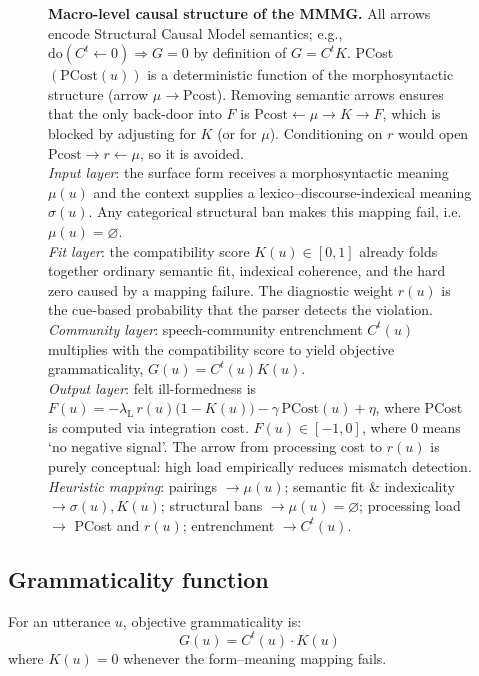 \documentclass[12pt]{article}
\begin{document}
\begin{figure}[htbp]
\begin{tikzpicture}[
  node distance = 1cm and 2.0cm,
  > = latex,
  var/.style = {rectangle, draw, rounded corners, align=center,
                inner sep=4pt, font=\small}
]
\end{tikzpicture}
\caption[Macro-level causal structure]%
{\textbf{Macro-level causal structure of the MMMG.} All arrows encode Structural Causal Model semantics; e.g., $\text{do}(C^{t} \leftarrow 0) \Rightarrow G = 0$ by definition of $G = C^{t}K$. 
PCost $(\text{PCost}(u))$ is a deterministic function of the morphosyntactic structure (arrow $\mu\!\to\!\text{Pcost}$). Removing semantic arrows ensures that the only back-door into $F$ is $\text{Pcost}\!\leftarrow\!\mu\!\to\!K\!\to\!F$, which is blocked by adjusting for $K$ (or for $\mu$). Conditioning on $r$ would open $\text{Pcost}\!\to\!r\!\leftarrow\!\mu$, so it is avoided.
\\\emph{Input layer}: the surface form receives a morphosyntactic meaning $\mu(u)$
and the context supplies a lexico–discourse-indexical meaning $\sigma(u)$.
Any categorical structural ban makes this mapping fail, i.e.\ $\mu(u)=\varnothing$.
\\\emph{Fit layer}: the compatibility score $K(u)\!\in[0,1]$ already folds together ordinary
semantic fit, indexical coherence, and the hard zero caused by a mapping failure.
The diagnostic weight $r(u)$ is the cue-based probability that the parser detects the
violation. 
\\\emph{Community layer}: speech-community entrenchment $C^{t}(u)$ multiplies with the
compatibility score to yield objective grammaticality,
$G(u)=C^{t}(u)K(u)$.
\\\emph{Output layer}: felt ill-formedness is
$F(u)= -\lambda_{\mathrm L}\,r(u)\!\bigl(1-K(u)\bigr)
       -\gamma\,\text{PCost}(u)+\eta$,
where PCost is computed via integration cost. $F(u)\!\in[-1,0]$, where 0 means `no negative signal'. The arrow from processing cost to $r(u)$ is purely conceptual: high load empirically reduces mismatch detection.
\\\emph{Heuristic mapping}: pairings $\to\mu(u)$;
semantic fit \& indexicality $\to\sigma(u),K(u)$;
structural bans $\to\mu(u)=\varnothing$;
processing load $\to$ PCost and $r(u)$;
entrenchment $\to C^{t}(u)$.}
\label{fig:causal-dag}
\end{figure}

\subsection{Grammaticality function}

For an utterance $u$, objective grammaticality is:
\begin{equation}\label{eq:G}
G(u)=C^{t}(u)\cdot K(u)
\end{equation}
where $K(u) = 0$ whenever the form–meaning mapping fails.
\end{document}
